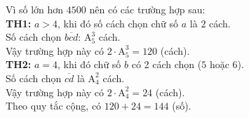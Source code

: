 \begin{bt}
{\begin{enumerate}
Vì số lớn hơn $4500$ nên có các trường hợp sau:\\
{\bf TH1:} $a>4$, khi đó số cách chọn chữ số $a$ là $2$ cách.\\
Số cách chọn $\overline{bcd}$: $\mathrm{A}_5^3$ cách.\\
Vậy trường hợp này có $2\cdot \mathrm{A}_5^3=120$ (cách).\\
{\bf TH2:} $a=4$, khi đó chữ số $b$ có 2 cách chọn ($5$ hoặc $6$).\\
Số cách chọn $\overline{cd}$ là $\mathrm{A}_4^2$ cách.\\
Vậy trường hợp này có $2\cdot \mathrm{A}_4^2=24$ (cách).\\
Theo quy tắc cộng, có $120+24=144$ (số).
\end{enumerate}
}
\end{bt}

